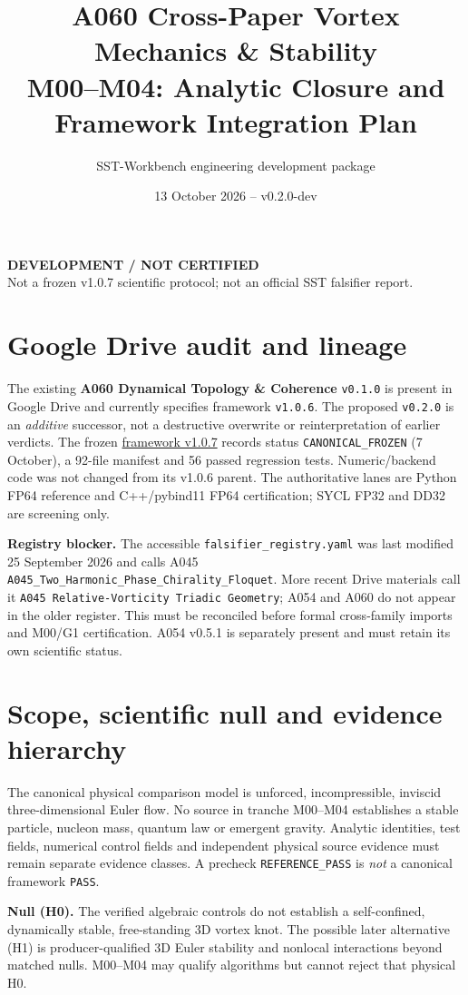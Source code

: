 \documentclass[10pt,a4paper]{article}
\title{\vspace{-1em}\textbf{A060 Cross-Paper Vortex Mechanics \& Stability}\\[.4em]\large M00--M04: Analytic Closure and Framework Integration Plan}
\author{SST-Workbench engineering development package}
\date{13 October 2026 -- v0.2.0-dev}
\newcommand{\code}[1]{\texttt{#1}}
\newcommand{\status}{\textcolor{BrickRed}{\bfseries DEVELOPMENT / NOT CERTIFIED}}
\begin{document}
\maketitle
\begin{center}\status\\\small Not a frozen v1.0.7 scientific protocol; not an official SST falsifier report.
\end{center}
\section{Google Drive audit and lineage}
The existing \textbf{A060 Dynamical Topology \& Coherence} \code{v0.1.0} is present in Google Drive and currently specifies framework \code{v1.0.6}. The proposed \code{v0.2.0} is an \emph{additive} successor, not a destructive overwrite or reinterpretation of earlier verdicts. The frozen \href{https://drive.google.com/drive/folders/1IASDEqmcEQXHyTfppetIGgYnVUsvN5hE}{framework v1.0.7} records status \code{CANONICAL\_FROZEN} (7 October), a 92-file manifest and 56 passed regression tests. Numeric/backend code was not changed from its v1.0.6 parent. The authoritative lanes are Python FP64 reference and C++/pybind11 FP64 certification; SYCL FP32 and DD32 are screening only.

\textbf{Registry blocker.} The accessible \code{falsifier\_registry.yaml} was last modified 25 September 2026 and calls A045 \code{A045\_Two\_Harmonic\_Phase\_Chirality\_Floquet}. More recent Drive materials call it \code{A045 Relative-Vorticity Triadic Geometry}; A054 and A060 do not appear in the older register. This must be reconciled before formal cross-family imports and M00/G1 certification. A054 v0.5.1 is separately present and must retain its own scientific status.

\section{Scope, scientific null and evidence hierarchy}
The canonical physical comparison model is unforced, incompressible, inviscid three-dimensional Euler flow. No source in tranche M00--M04 establishes a stable particle, nucleon mass, quantum law or emergent gravity. Analytic identities, test fields, numerical control fields and independent physical source evidence must remain separate evidence classes. A precheck \code{REFERENCE\_PASS} is \emph{not} a canonical framework \code{PASS}.

\textbf{Null (H0).} The verified algebraic controls do not establish a self-confined, dynamically stable, free-standing 3D vortex knot. The possible later alternative (H1) is producer-qualified 3D Euler stability and nonlocal interactions beyond matched nulls. M00--M04 may qualify algorithms but cannot reject that physical H0.
\end{document}
